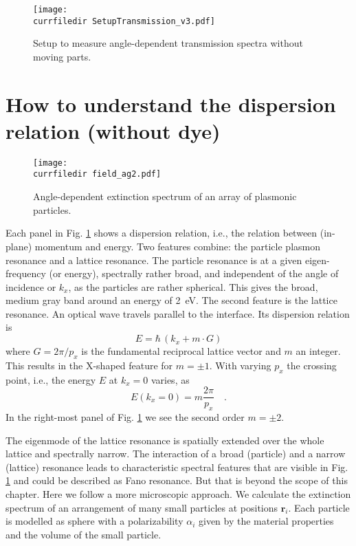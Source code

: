 \begin{figure}
\texttt{[image: \\currfiledir SetupTransmission\_v3.pdf]}
\caption{Setup to measure angle-dependent transmission spectra without moving parts. }
\end{figure}


\section{How to understand the dispersion relation (without dye)}

\begin{figure}
  \texttt{[image: \\currfiledir field\_ag2.pdf]}
  \caption{Angle-dependent extinction spectrum of an array of plasmonic particles. \label{fig:8_without_dye} }
  \end{figure}
  

  

Each panel in Fig. \ref{fig:8_without_dye} shows a dispersion relation, i.e., the relation between (in-plane) momentum and energy. Two features combine: the particle plasmon resonance and a lattice resonance. The particle resonance is at a given eigen-frequency (or energy), spectrally rather broad, and independent of the angle of incidence or $k_x$, as the particles are rather spherical. This gives the broad, medium gray band around an energy of 2~eV. The second feature is the lattice resonance.  An optical wave travels parallel to the interface. Its dispersion relation is
\begin{equation}
 E =   \hbar  \, \left(  k_x + m \cdot G \right)
\end{equation}
where $G = 2 \pi / p_x$ is the fundamental reciprocal lattice vector and $m$ an integer. This results in the X-shaped feature for $m = \pm 1$. With varying $p_x$ the crossing point, i.e., the energy $E$ at $k_x = 0$ varies, as
\begin{equation}
  E(k_x = 0) = m \frac{2 \pi}{p_x} \quad .
\end{equation}
In the right-most panel of  Fig. \ref{fig:8_without_dye} we see the second order $m= \pm 2 $.

The eigenmode of the lattice resonance is spatially extended over the whole lattice and spectrally narrow. The interaction of a broad (particle)  and a narrow (lattice) resonance leads to characteristic spectral features that are visible in Fig. \ref{fig:8_without_dye}  and could be described as Fano resonance. But that is beyond the scope of this chapter. Here we follow a more microscopic approach. We calculate the extinction spectrum of an  arrangement of  many small particles at positions $\mathbf{r}_i$.
Each  particle is modelled as sphere  with a  polarizability $\alpha_i$ given by the material properties and the volume of the small particle. 


